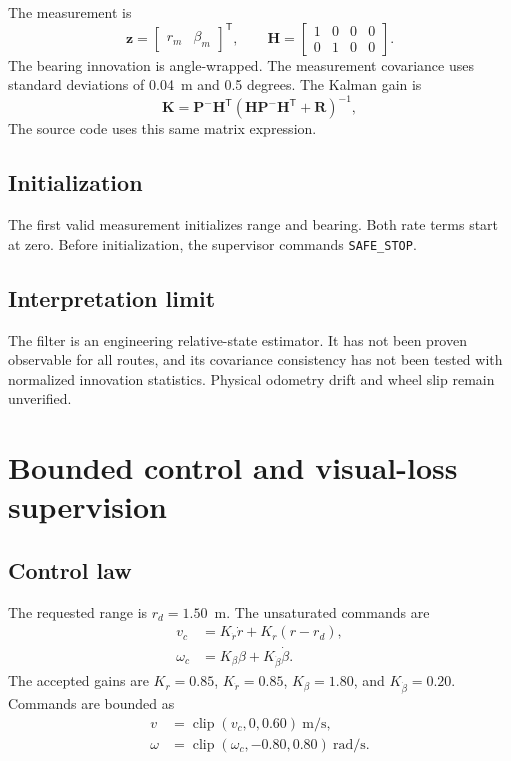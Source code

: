 \documentclass[11pt,oneside,openany]{book}
\newcommand{\state}[1]{\texttt{#1}}
\begin{document}
The measurement is
\begin{equation}
\mathbf z=\begin{bmatrix}r_m & \beta_m\end{bmatrix}^{\mathsf T},\qquad
\mathbf H=\begin{bmatrix}1&0&0&0\\0&1&0&0\end{bmatrix}.
\end{equation}
The bearing innovation is angle-wrapped. The measurement covariance uses standard deviations of 0.04~m and 0.5 degrees. The Kalman gain is
\begin{equation}
\mathbf K=\mathbf P^-\mathbf H^{\mathsf T}
(\mathbf H\mathbf P^-\mathbf H^{\mathsf T}+\mathbf R)^{-1},
\end{equation}
The source code uses this same matrix expression.

\section{Initialization}

The first valid measurement initializes range and bearing. Both rate terms start at zero. Before initialization, the supervisor commands \state{SAFE\_STOP}.

\section{Interpretation limit}

The filter is an engineering relative-state estimator. It has not been proven observable for all routes, and its covariance consistency has not been tested with normalized innovation statistics. Physical odometry drift and wheel slip remain unverified.

\chapter{Bounded control and visual-loss supervision}

\section{Control law}

The requested range is $r_d=1.50$~m. The unsaturated commands are
\begin{align}
v_c &= K_{\dot r}\dot r+K_r(r-r_d),\\
\omega_c &= K_\beta\beta+K_{\dot\beta}\dot\beta.
\end{align}
The accepted gains are $K_r=0.85$, $K_{\dot r}=0.85$, $K_\beta=1.80$, and $K_{\dot\beta}=0.20$. Commands are bounded as
\begin{align}
v &= \operatorname{clip}(v_c,0,0.60)\ \mathrm{m/s},\\
\omega &= \operatorname{clip}(\omega_c,-0.80,0.80)\ \mathrm{rad/s}.
\end{align}
\end{document}
